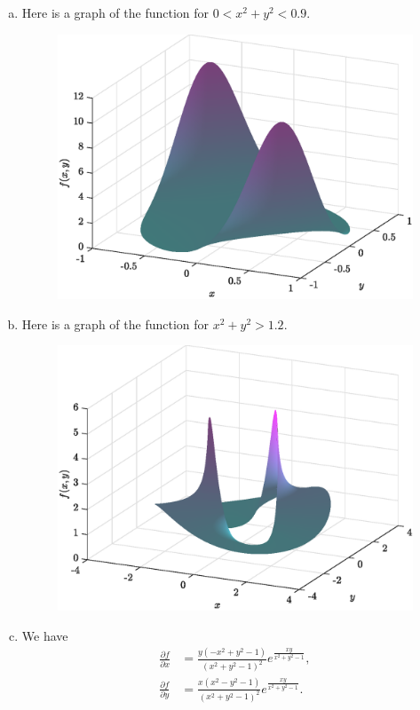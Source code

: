 \documentclass[12pt]{article} %
\begin{document}
\begin{solution}
\begin{enumerate}[(a)]
    \item Here is a graph of the function for $0<x^2+y^2<0.9$. 
    \begin{figure}[H]
        \centering
        \includegraphics[width=.8\textwidth]{figures/3a}
    \end{figure}

    \item Here is a graph of the function for $x^2+y^2>1.2$. 
    \begin{figure}[H]
        \centering
        \includegraphics[width=.8\textwidth]{figures/3b}
    \end{figure}

    \item We have
    \begin{align*}
    \frac{\partial f}{\partial x} &= \frac{y(-x^2+y^2-1)}{(x^2+y^2-1)^2}e^{\frac{xy}{x^2+y^2-1}} ,\\
    \frac{\partial f}{\partial y} &= \frac{x(x^2-y^2-1)}{(x^2+y^2-1)^2} e^{\frac{xy}{x^2+y^2-1}}.\\
    \end{align*}


\end{enumerate}
\end{solution}
\end{document}
